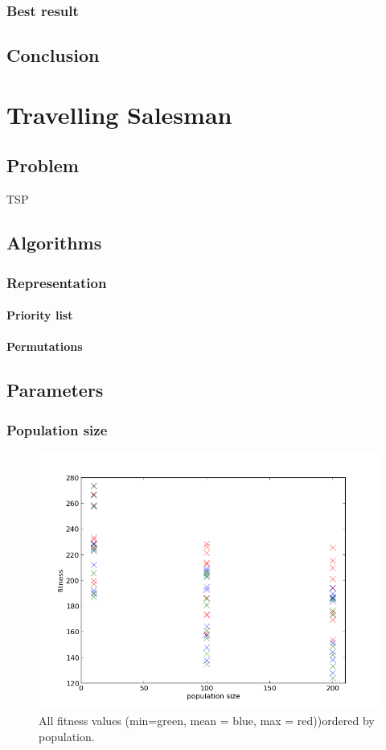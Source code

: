 \documentclass{scrartcl}
\begin{document}
\subsubsection{Best result}

\subsection{Conclusion}



\section{Travelling Salesman}

\subsection{Problem}
TSP

\subsection{Algorithms}

\subsubsection{Representation}
\paragraph{Priority list}
\paragraph{Permutations}

\subsection{Parameters}
\subsubsection{Population size}

\begin{figure}
 \center
 \includegraphics[width=.5\linewidth]{img/ex3/tsp_fitness_population.png}
 \caption{All fitness values (min=green, mean = blue, max = red))ordered by population.}
\end{figure}
\end{document}
